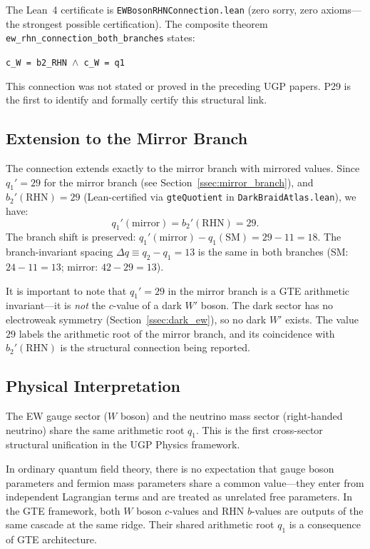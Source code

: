 \documentclass[11pt]{article}
\begin{document}
The Lean~4 certificate is \texttt{EWBosonRHNConnection.lean} (zero sorry, zero axioms---the
strongest possible certification). The composite theorem
\texttt{ew\_rhn\_connection\_both\_branches} states:
\begin{center}
\texttt{c\_W = b2\_RHN $\wedge$ c\_W = q1}
\end{center}
This connection was not stated or proved in the preceding UGP papers. P29 is the first
to identify and formally certify this structural link.

\subsection{Extension to the Mirror Branch}
\label{ssec:ew_rhn_mirror}

The connection extends exactly to the mirror branch with mirrored values. Since
$q_1' = 29$ for the mirror branch (see Section~\ref{ssec:mirror_branch}), and
$b_2'(\mathrm{RHN}) = 29$ (Lean-certified via \texttt{gteQuotient} in
\texttt{DarkBraidAtlas.lean}), we have:
\begin{equation}
q_1'(\mathrm{mirror}) = b_2'(\mathrm{RHN}) = 29.
\label{eq:ew_rhn_mirror}
\end{equation}
The branch shift is preserved: $q_1'(\mathrm{mirror}) - q_1(\mathrm{SM}) = 29 - 11 = 18$.
The branch-invariant spacing $\Delta q \equiv q_2 - q_1 = 13$ is the same in both
branches (SM: $24-11=13$; mirror: $42-29=13$).

It is important to note that $q_1'=29$ in the mirror branch is a GTE arithmetic
invariant---it is \emph{not} the $c$-value of a dark $W'$ boson. The dark sector has
no electroweak symmetry (Section~\ref{ssec:dark_ew}), so no dark $W'$ exists. The
value $29$ labels the arithmetic root of the mirror branch, and its coincidence with
$b_2'(\mathrm{RHN})$ is the structural connection being reported.

\subsection{Physical Interpretation}
\label{ssec:ew_rhn_physics}

The EW gauge sector ($W$ boson) and the neutrino mass sector (right-handed neutrino)
share the same arithmetic root $q_1$. This is the first cross-sector structural
unification in the UGP Physics framework.

In ordinary quantum field theory, there is no expectation that gauge boson parameters
and fermion mass parameters share a common value---they enter from independent Lagrangian
terms and are treated as unrelated free parameters. In the GTE framework, both $W$ boson
$c$-values and RHN $b$-values are outputs of the same cascade at the same ridge.
Their shared arithmetic root $q_1$ is a consequence of GTE architecture.
\end{document}
